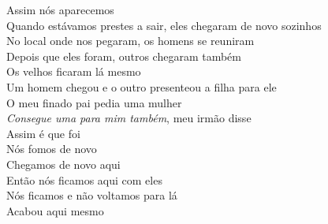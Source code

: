 \begin{linenumbers}\begingroup\raggedright
 
\noindent   Assim nós aparecemos\\
  Quando estávamos prestes a sair, eles chegaram de novo sozinhos\\
  No local onde nos pegaram, os homens se reuniram\\
  Depois que eles foram, outros chegaram também\\
  Os velhos ficaram lá mesmo\\
  Um homem chegou e o outro presenteou a filha para ele\\
  O meu finado pai pedia uma mulher\\
  \emph{Consegue uma para mim também}, meu irmão disse\\
  Assim é que foi\\
  Nós fomos de novo\\
  Chegamos de novo aqui\\
  Então nós ficamos aqui com eles\\
  Nós ficamos e não voltamos para lá\\
  Acabou aqui mesmo
 
\end{linenumbers}\endgroup

\bigskip

